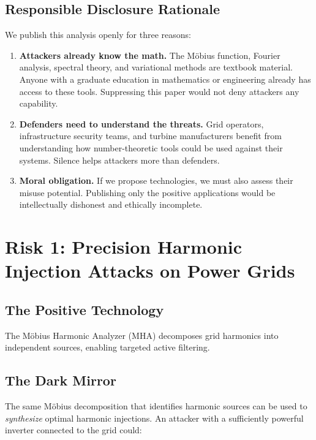 \documentclass[11pt,a4paper]{article}
\begin{document}
\subsection{Responsible Disclosure Rationale}

We publish this analysis openly for three reasons:

\begin{enumerate}
  \item \textbf{Attackers already know the math.} The M\"obius
    function, Fourier analysis, spectral theory, and variational
    methods are textbook material. Anyone with a graduate education
    in mathematics or engineering already has access to these tools.
    Suppressing this paper would not deny attackers any capability.

  \item \textbf{Defenders need to understand the threats.} Grid
    operators, infrastructure security teams, and turbine
    manufacturers benefit from understanding how number-theoretic
    tools could be used against their systems. Silence helps
    attackers more than defenders.

  \item \textbf{Moral obligation.} If we propose technologies, we
    must also assess their misuse potential. Publishing only the
    positive applications would be intellectually dishonest and
    ethically incomplete.
\end{enumerate}

\section{Risk 1: Precision Harmonic Injection Attacks on Power Grids}
\label{sec:harmonics}

\subsection{The Positive Technology}

The M\"obius Harmonic Analyzer (MHA) decomposes grid harmonics into
independent sources, enabling targeted active filtering.

\subsection{The Dark Mirror}

The same M\"obius decomposition that identifies harmonic sources
can be used to \emph{synthesize} optimal harmonic injections. An
attacker with a sufficiently powerful inverter connected to the
grid could:
\end{document}
